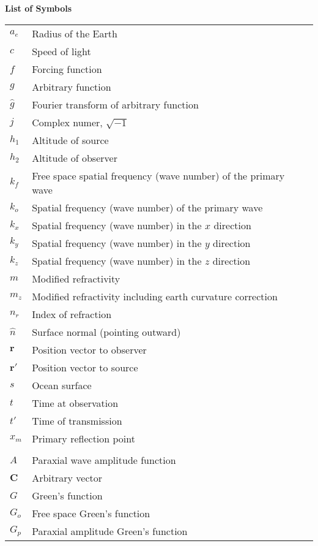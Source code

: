 \noindent\Large{\bf{List of Symbols}}

\vspace{24pt}

\small\normalsize
\begin{supertabular}{ll}
$a_e$ & Radius of the Earth \\
$c$ & Speed of light \\
$f$ & Forcing function \\
$g$ & Arbitrary function \\
$\hat{g}$ & Fourier transform of arbitrary function\\
$j$ & Complex numer, $\sqrt{-1}$ \\
$h_1$ & Altitude of source\\
$h_2$ & Altitude of observer\\
$k_f$ & Free space spatial frequency (wave number) of the primary wave \\
$k_o$ & Spatial frequency (wave number) of the primary wave \\
$k_x$ & Spatial frequency (wave number) in the $x$ direction \\
$k_y$ & Spatial frequency (wave number) in the $y$ direction \\
$k_z$ & Spatial frequency (wave number) in the $z$ direction \\
$m$ & Modified refractivity \\
$m_z$ & Modified refractivity including earth curvature correction\\
$n_r$ & Index of refraction \\
$\hat{n}$ & Surface normal (pointing outward) \\
$\mathbf{r}$ & Position vector to observer \\
$\mathbf{r}'$ & Position vector to source \\
$s$ & Ocean surface \\
$t$ & Time at observation\\
$t'$ & Time of transmission\\
$x_m$ & Primary reflection point \\
\\
$A$ & Paraxial wave amplitude function \\
$\mathbf{C}$ & Arbitrary vector \\
$G$ & Green's function \\
$G_o$ & Free space Green's function \\
$G_p$ & Paraxial amplitude Green’s function \\

\end{supertabular}
